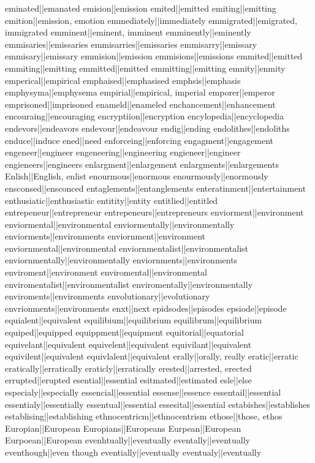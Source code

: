 eminated||emanated
emision||emission
emited||emitted
emiting||emitting
emition||emission, emotion
emmediately||immediately
emmigrated||emigrated, immigrated
emminent||eminent, imminent
emminently||eminently
emmisaries||emissaries
emmisarries||emissaries
emmisarry||emissary
emmisary||emissary
emmision||emission
emmisions||emissions
emmited||emitted
emmiting||emitting
emmitted||emitted
emmitting||emitting
emnity||enmity
emperical||empirical
emphaised||emphasised
emphsis||emphasis
emphysyma||emphysema
empirial||empirical, imperial
emporer||emperor
emprisoned||imprisoned
enameld||enameled
enchancement||enhancement
encouraing||encouraging
encryptiion||encryption
encylopedia||encyclopedia
endevors||endeavors
endevour||endeavour
endig||ending
endolithes||endoliths
enduce||induce
ened||need
enforceing||enforcing
engagment||engagement
engeneer||engineer
engeneering||engineering
engieneer||engineer
engieneers||engineers
enlargment||enlargement
enlargments||enlargements
Enlish||English, enlist
enourmous||enormous
enourmously||enormously
ensconsed||ensconced
entaglements||entanglements
enteratinment||entertainment
enthusiatic||enthusiastic
entitity||entity
entitlied||entitled
entrepeneur||entrepreneur
entrepeneurs||entrepreneurs
enviorment||environment
enviormental||environmental
enviormentally||environmentally
enviorments||environments
enviornment||environment
enviornmental||environmental
enviornmentalist||environmentalist
enviornmentally||environmentally
enviornments||environments
enviroment||environment
enviromental||environmental
enviromentalist||environmentalist
enviromentally||environmentally
enviroments||environments
envolutionary||evolutionary
envrionments||environments
enxt||next
epidsodes||episodes
epsiode||episode
equialent||equivalent
equilibium||equilibrium
equilibrum||equilibrium
equiped||equipped
equippment||equipment
equitorial||equatorial
equivelant||equivalent
equivelent||equivalent
equivilant||equivalent
equivilent||equivalent
equivlalent||equivalent
erally||orally, really
eratic||erratic
eratically||erratically
eraticly||erratically
erested||arrested, erected
errupted||erupted
esential||essential
esitmated||estimated
esle||else
especialy||especially
essencial||essential
essense||essence
essentail||essential
essentialy||essentially
essentual||essential
essesital||essential
estabishes||establishes
establising||establishing
ethnocentricm||ethnocentrism
ethose||those, ethos
Europian||European
Europians||Europeans
Eurpean||European
Eurpoean||European
evenhtually||eventually
eventally||eventually
eventhough||even though
eventially||eventually
eventualy||eventually
